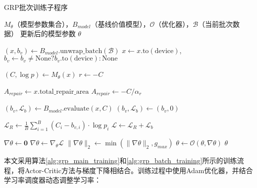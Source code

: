 \begin{algorithm}[H]
	\begin{algorithmic}[1]
		\caption{GRP批次训练子程序}
		\label{alg:grp_batch_training}
		\Require $M_{\theta}$（模型参数集合），$B_{model}$（基线价值模型），$\mathcal{O}$（优化器），$\mathcal{B}$（当前批次数据）
		\Ensure 更新后的模型参数 $\theta$

		\State $(x, b_v) \leftarrow B_{model}.\text{unwrap\_batch}(\mathcal{B})$ 
		\State $x \leftarrow x.\text{to}(\text{device})$, $b_v \leftarrow b_v \neq \text{None} ? b_v.\text{to}(\text{device}) : \text{None}$ 

		\State $(C, \log p) \leftarrow M_{\theta}(x)$ 
		\State $r \leftarrow -C$ 

			\State $A_{repair} \leftarrow x.\text{total\_repair\_area}$ 
		\Else
			\State $A_{repair} \leftarrow -C / \alpha_{r}$ 
		\EndIf

			\State $(b_v, \mathcal{L}_{b}) \leftarrow B_{model}.\text{evaluate}(x, C)$ 
		\Else
			\State $(b_v, \mathcal{L}_{b}) \leftarrow (b_v, 0)$ 
		\EndIf

		\State $\mathcal{L}_{R} \leftarrow \frac{1}{B}\sum_{i=1}^{B}(C_i - b_{v,i}) \cdot \log p_i$ 
		\State $\mathcal{L} \leftarrow \mathcal{L}_{R} + \mathcal{L}_{b}$ 

		\State $\nabla\theta \leftarrow \mathbf{0}$ 
		\State $\nabla\theta \leftarrow \nabla_{\theta}\mathcal{L}$ 
		\State $\|\nabla\theta\|_2 \leftarrow \min(\|\nabla\theta\|_2, g_{max})$ 
		\State $\theta \leftarrow \mathcal{O}(\theta, \nabla\theta)$ 
		\State \Return $\theta$ 
	\end{algorithmic}
\end{algorithm}

本文采用算法\ref{alg:grp_main_training}和\ref{alg:grp_batch_training}所示的训练流程，将Actor-Critic方法与梯度下降相结合。训练过程中使用Adam优化器，并结合学习率调度器动态调整学习率：

